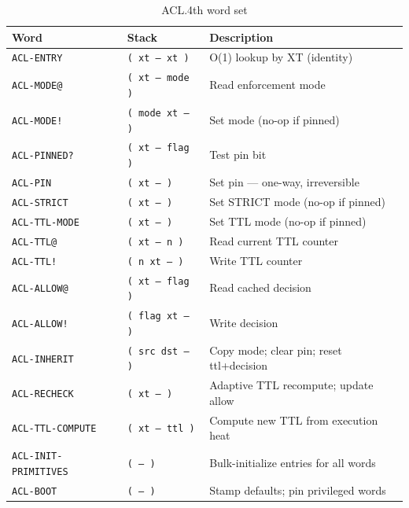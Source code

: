\begin{table}[ht]
  \centering
  \caption{ACL.4th word set}
  \label{tab:acl-words}
  \begin{tabular}{lll}
    \toprule
    Word & Stack & Description \\
    \midrule
    \texttt{ACL-ENTRY}           & \texttt{( xt -- xt )}     & O(1) lookup by XT (identity) \\
    \texttt{ACL-MODE@}           & \texttt{( xt -- mode )}   & Read enforcement mode \\
    \texttt{ACL-MODE!}           & \texttt{( mode xt -- )}   & Set mode (no-op if pinned) \\
    \texttt{ACL-PINNED?}         & \texttt{( xt -- flag )}   & Test pin bit \\
    \texttt{ACL-PIN}             & \texttt{( xt -- )}        & Set pin --- one-way, irreversible \\
    \texttt{ACL-STRICT}          & \texttt{( xt -- )}        & Set STRICT mode (no-op if pinned) \\
    \texttt{ACL-TTL-MODE}        & \texttt{( xt -- )}        & Set TTL mode (no-op if pinned) \\
    \texttt{ACL-TTL@}            & \texttt{( xt -- n )}      & Read current TTL counter \\
    \texttt{ACL-TTL!}            & \texttt{( n xt -- )}      & Write TTL counter \\
    \texttt{ACL-ALLOW@}          & \texttt{( xt -- flag )}   & Read cached decision \\
    \texttt{ACL-ALLOW!}          & \texttt{( flag xt -- )}   & Write decision \\
    \texttt{ACL-INHERIT}         & \texttt{( src dst -- )}   & Copy mode; clear pin; reset ttl+decision \\
    \texttt{ACL-RECHECK}         & \texttt{( xt -- )}        & Adaptive TTL recompute; update allow \\
    \texttt{ACL-TTL-COMPUTE}     & \texttt{( xt -- ttl )}    & Compute new TTL from execution heat \\
    \texttt{ACL-INIT-PRIMITIVES} & \texttt{( -- )}           & Bulk-initialize entries for all words \\
    \texttt{ACL-BOOT}            & \texttt{( -- )}           & Stamp defaults; pin privileged words \\
    \bottomrule
  \end{tabular}
\end{table}

